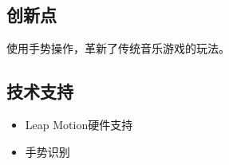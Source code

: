\documentclass{article} \usepackage{CJK}
\begin{document}
\subsection{创新点}
使用手势操作，革新了传统音乐游戏的玩法。
\subsection{技术支持}
\begin{itemize}
  \item Leap Motion硬件支持
  \item 手势识别
\end{itemize}
\newpage
\section{}
\end{document}
